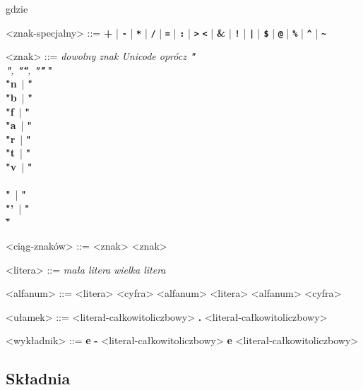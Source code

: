 \documentclass[12pt]{article}
\begin{document}
gdzie\\

\begin{grammar}

<znak-specjalny> ::=
    \textbf{+}
    | \textbf{\texttt{-}}
    | \textbf{\texttt{*}}
    | \textbf{\texttt{/}}
    | \textbf{\texttt{=}}
    | \textbf{\texttt{:}}
    | \textbf{\texttt{\textgreater}}
    \alt \textbf{\texttt{\textless}}
    | \textbf{\&}
    | \textbf{\texttt{!}}
    | \textbf{\texttt{|}}
    | \textbf{\texttt{\$}}
    | \textbf{\texttt{@}}
    | \textbf{\texttt{\%}}
    | \textbf{\texttt{\^}}
    | \textbf{\texttt{\~}}

    <znak> ::= 
        \textit{dowolny znak Unicode oprócz 
            \textbf{"\\"}, \textbf{"\""}, \textbf{"\'"}}
        \alt \textbf{"\\"n}\,
        | \textbf{"\\"b}\,
        | \textbf{"\\"f}\,
        | \textbf{"\\"a}\,
        | \textbf{"\\"r}\,
        | \textbf{"\\"t}\,
        | \textbf{"\\"v}\,
        | \textbf{"\\\\"}\,
        | \textbf{"\\"'}\,
        | \textbf{"\\\""}\,

    <ciąg-znaków> ::=
        <znak>
         <znak>
    
    <litera> ::=
        \textit{mała litera}
        \alt \textit{wielka litera}

    <alfanum> ::=
        <litera>
        \alt <cyfra>
        \alt <alfanum> <litera>
        \alt <alfanum> <cyfra>

    <ułamek> ::=
        <literał-całkowitoliczbowy> \textbf{.} <literał-całkowitoliczbowy>
    
    <wykładnik> ::=
        \textbf{e} \textbf{-} <literał-całkowitoliczbowy>
        \alt \textbf{e} <literał-całkowitoliczbowy>

\end{grammar}

\subsection{Składnia}
\end{document}
